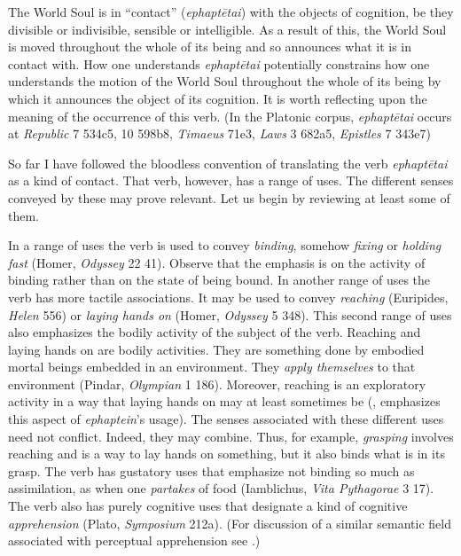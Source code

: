 The World Soul is in ``contact'' (\emph{ephaptētai}) with the objects of cognition, be they divisible or indivisible, sensible or intelligible. As a result of this, the World Soul is moved throughout the whole of its being and so announces what it is in contact with. How one understands \emph{ephaptētai} potentially constrains how one understands the motion of the World Soul throughout the whole of its being by which it announces the object of its cognition. It is worth reflecting upon the meaning of the occurrence of this verb. (In the Platonic corpus, \emph{ephaptētai} occurs at \emph{Republic} 7 534c5, 10 598b8, \emph{Timaeus} 71e3, \emph{Laws} 3 682a5, \emph{Epistles} 7 343e7)

So far I have followed the bloodless convention of translating the verb \emph{ephaptētai} as a kind of contact. That verb, however, has a range of uses. The different senses conveyed by these may prove relevant. Let us begin by reviewing at least some of them.

In a range of uses the verb is used to convey \emph{binding}, somehow \emph{fixing} or \emph{holding fast} (Homer, \emph{Odyssey} 22 41). Observe that the emphasis is on the activity of binding rather than on the state of being bound. In another range of uses the verb has more tactile associations. It may be used to convey \emph{reaching} (Euripides, \emph{Helen} 556) or \emph{laying hands on} (Homer, \emph{Odyssey} 5 348). This second range of uses also emphasizes the bodily activity of the subject of the verb. Reaching and laying hands on are bodily activities. They are something done by embodied mortal beings embedded in an environment. They \emph{apply themselves} to that environment (Pindar, \emph{Olympian} 1 186). Moreover, reaching is an exploratory activity in a way that laying hands on may at least sometimes be (\citealt[134]{Betegh:2019fq}, emphasizes this aspect of \emph{ephaptein}'s usage). The senses associated with these different uses need not conflict. Indeed, they may combine. Thus, for example, \emph{grasping} involves reaching and is a way to lay hands on something, but it also binds what is in its grasp. The verb has gustatory uses that emphasize not binding so much as assimilation, as when one \emph{partakes} of food (Iamblichus, \emph{Vita Pythagorae} 3 17). The verb also has purely cognitive uses that designate a kind of cognitive \emph{apprehension} (Plato, \emph{Symposium} 212a). (For discussion of a similar semantic field associated with perceptual apprehension see \citealt[chapters 1--2]{Kalderon:2018oe}.)

